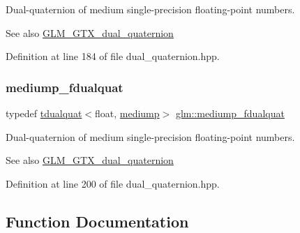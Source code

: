 Dual-\/quaternion of medium single-\/precision floating-\/point numbers.

\begin{DoxySeeAlso}{See also}
\mbox{\hyperlink{group__gtx__dual__quaternion}{G\+L\+M\+\_\+\+G\+T\+X\+\_\+dual\+\_\+quaternion}} 
\end{DoxySeeAlso}


Definition at line 184 of file dual\+\_\+quaternion.\+hpp.

\mbox{\label{group__gtx__dual__quaternion_ga93e9def86ffeedd48d9c79a6afacfa6c}} 
\subsubsection{\texorpdfstring{mediump\_fdualquat}{mediump\_fdualquat}}
{\footnotesize\ttfamily typedef \mbox{\hyperlink{structglm_1_1tdualquat}{tdualquat}}$<$float, \mbox{\hyperlink{namespaceglm_a0f04f086094c747d227af4425893f545a6416f3ea0c9025fb21ed50c4d6620482}{mediump}}$>$ \mbox{\hyperlink{group__gtx__dual__quaternion_ga93e9def86ffeedd48d9c79a6afacfa6c}{glm\+::mediump\+\_\+fdualquat}}}

Dual-\/quaternion of medium single-\/precision floating-\/point numbers.

\begin{DoxySeeAlso}{See also}
\mbox{\hyperlink{group__gtx__dual__quaternion}{G\+L\+M\+\_\+\+G\+T\+X\+\_\+dual\+\_\+quaternion}} 
\end{DoxySeeAlso}


Definition at line 200 of file dual\+\_\+quaternion.\+hpp.



\subsection{Function Documentation}
\mbox{\label{group__gtx__dual__quaternion_gada9799afe2b62394dc498534beb5bc78}} 
